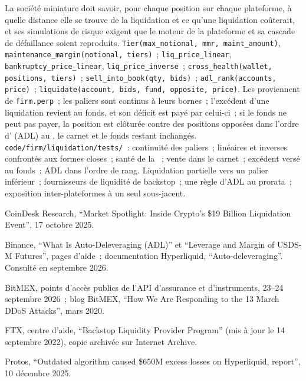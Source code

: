 \begin{build}
 La société miniature doit savoir, pour chaque position sur chaque plateforme, à quelle distance elle se trouve de la liquidation et
ce qu'une liquidation coûterait, et ses simulations de risque exigent que le moteur de la plateforme et sa cascade de défaillance soient reproduits.
 \texttt{Tier(max\_notional, mmr, maint\_amount)}, \texttt{maintenance\_margin(notional, tiers)}~;
\texttt{liq\_price\_linear}, \texttt{bankruptcy\_price\_linear}, \texttt{liq\_price\_inverse}~;
\texttt{cross\_health(wallet, positions, tiers)}~; \texttt{sell\_into\_book(qty, bids)}~; \texttt{adl\_rank(accounts,
price)}~; \texttt{liquidate(account, bids, fund, opposite, price)}.
 Les  proviennent de \texttt{firm.perp}~; les paliers sont continus à leurs bornes~; l'excédent d'une liquidation revient au
fonds, et son déficit est payé par celui-ci~; si le fonds ne peut pas payer, la position est clôturée contre des positions opposées dans l'ordre
d' (ADL) au , le carnet et le fonds restant inchangés.
 \texttt{code/firm/liquidation/tests/}~: continuité des paliers~;  linéaires et
inverses confrontés aux formes closes~; santé de la ~; vente dans le carnet~; excédent versé au fonds~; ADL dans l'ordre de rang.
 Liquidation partielle vers un palier inférieur~; fournisseurs de liquidité de backstop~; une règle d'ADL au prorata~; exposition inter-plateformes
à un seul sous-jacent.
\end{build}

\begin{omsources}
\item CoinDesk Research, ``Market Spotlight: Inside Crypto's \$19 Billion Liquidation Event'', 17 octobre 2025.
\item Binance, ``What Is Auto-Deleveraging (ADL)'' et ``Leverage and Margin of USDS-M Futures'', pages d'aide~;
documentation Hyperliquid, ``Auto-deleveraging''. Consulté en septembre 2026.
\item BitMEX, points d'accès publics de l'API d'assurance et d'instruments, 23--24 septembre 2026~; blog BitMEX, ``How We Are Responding to the 13 March
DDoS Attacks'', mars 2020.
\item FTX, centre d'aide, ``Backstop Liquidity Provider Program'' (mis à jour le 14 septembre 2022), copie archivée sur Internet Archive.
\item Protos, ``Outdated algorithm caused \$650M excess losses on Hyperliquid, report'', 10 décembre 2025.
\end{omsources}

